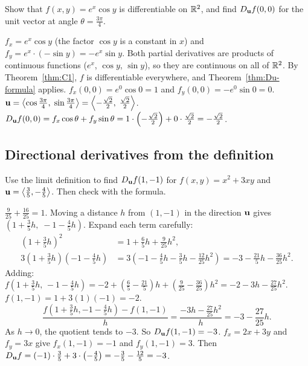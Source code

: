 \begin{problem}\label{prob:p2}
Show that $f(x,y)=e^x\cos y$ is differentiable on $\mathbb{R}^2$, and find $D_{\mathbf{u}} f(0,0)$
for the unit vector at angle $\theta=\frac{3\pi}{4}$.
\end{problem}
\begin{solution}
 $f_x=e^x\cos y$ (the factor $\cos y$ is a constant in $x$) and
$f_y=e^x\cdot(-\sin y)=-e^x\sin y$.
 Both partial derivatives are products of continuous functions
($e^x$, $\cos y$, $\sin y$), so they are continuous on all of $\mathbb{R}^2$. By Theorem~\ref{thm:C1},
$f$ is differentiable everywhere, and Theorem~\ref{thm:Du-formula} applies.
 $f_x(0,0)=e^0\cos0=1$ and $f_y(0,0)=-e^0\sin0=0$.
 $\mathbf{u}=\left\langle \cos\frac{3\pi}{4},\;\sin\frac{3\pi}{4} \right\rangle=\left\langle -\frac{\sqrt2}{2},\;\frac{\sqrt2}{2} \right\rangle$.
$D_{\mathbf{u}} f(0,0)=f_x\cos\theta+f_y\sin\theta=1\cdot\left(-\frac{\sqrt2}{2}\right)+0\cdot\frac{\sqrt2}{2}=-\frac{\sqrt2}{2}$.
\end{solution}

\subsection{Directional derivatives from the definition}

\begin{problem}\label{prob:p9}
Use the limit definition to find $D_{\mathbf{u}} f(1,-1)$ for $f(x,y)=x^2+3xy$ and
$\mathbf{u}=\left\langle \frac35,-\frac45 \right\rangle$. Then check with the formula.
\end{problem}
\begin{solution}
 $\frac{9}{25}+\frac{16}{25}=1$.\checkok
{} Moving a distance $h$ from $(1,-1)$ in the direction $\mathbf{u}$ gives
$\left(1+\frac35h,\;-1-\frac45h\right)$.
 Expand each term carefully:
\begin{align*}
\left(1+\tfrac35h\right)^2&=1+\tfrac65h+\tfrac{9}{25}h^2,\\
3\left(1+\tfrac35h\right)\left(-1-\tfrac45h\right)&=3\left(-1-\tfrac45h-\tfrac35h-\tfrac{12}{25}h^2\right)
=-3-\tfrac{21}{5}h-\tfrac{36}{25}h^2 .
\end{align*}
Adding: $f\!\left(1+\tfrac35h,\,-1-\tfrac45h\right)=-2+\left(\tfrac65-\tfrac{21}{5}\right)h+\left(\tfrac{9}{25}-\tfrac{36}{25}\right)h^2
=-2-3h-\tfrac{27}{25}h^2$.
 $f(1,-1)=1+3(1)(-1)=-2$.
\[
  \frac{f\!\left(1+\frac35h,-1-\frac45h\right)-f(1,-1)}{h}=\frac{-3h-\frac{27}{25}h^2}{h}=-3-\frac{27}{25}h .
\]
 As $h\to0$, the quotient tends to $-3$. So $D_{\mathbf{u}} f(1,-1)=-3$.
 $f_x=2x+3y$ and $f_y=3x$ give $f_x(1,-1)=-1$ and
$f_y(1,-1)=3$. Then $D_{\mathbf{u}} f=(-1)\cdot\frac35+3\cdot\left(-\frac45\right)=-\frac35-\frac{12}{5}=-3$.\checkok
\end{solution}

